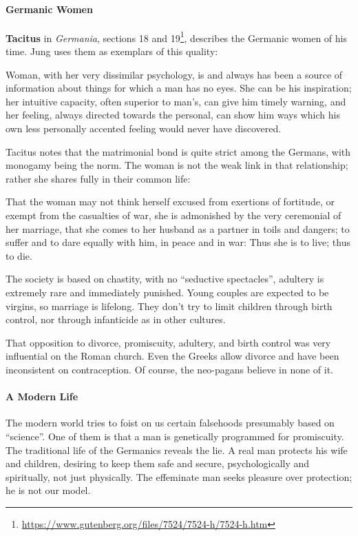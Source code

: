 \paragraph{Germanic Women}
\textbf{Tacitus} in \emph{Germania}, sections 18 and 19\footnote{\url{https://www.gutenberg.org/files/7524/7524-h/7524-h.htm}}, describes the Germanic women of his time. Jung uses them as exemplars of this quality:

\begin{quotex}
Woman, with her very dissimilar psychology, is and always has been a source of information about things for which a man has no eyes. She can be his inspiration; her intuitive capacity, often superior to man's, can give him timely warning, and her feeling, always directed towards the personal, can show him ways which his own less personally accented feeling would never have discovered. 

\end{quotex}
Tacitus notes that the matrimonial bond is quite strict among the Germans, with monogamy being the norm. The woman is not the weak link in that relationship; rather she shares fully in their common life:

\begin{quotex}
That the woman may not think herself excused from exertions of fortitude, or exempt from the casualties of war, she is admonished by the very ceremonial of her marriage, that she comes to her husband as a partner in toils and dangers; to suffer and to dare equally with him, in peace and in war: Thus she is to live; thus to die. 

\end{quotex}
The society is based on chastity, with no “seductive spectacles”, adultery is extremely rare and immediately punished. Young couples are expected to be virgins, so marriage is lifelong. They don't try to limit children through birth control, nor through infanticide as in other cultures.

That opposition to divorce, promiscuity, adultery, and birth control was very influential on the Roman church. Even the Greeks allow divorce and have been inconsistent on contraception. Of course, the neo-pagans believe in none of it.

\paragraph{A Modern Life}
The modern world tries to foist on us certain falsehoods presumably based on “science”. One of them is that a man is genetically programmed for promiscuity. The traditional life of the Germanics reveals the lie. A real man protects his wife and children, desiring to keep them safe and secure, psychologically and spiritually, not just physically. The effeminate man seeks pleasure over protection; he is not our model.

